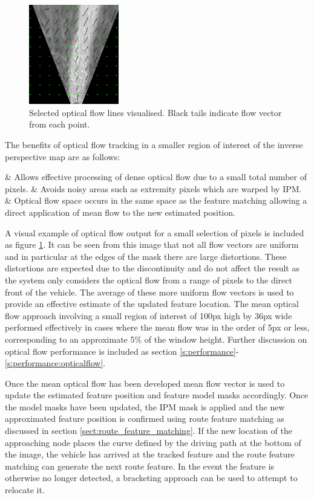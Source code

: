 \documentclass[]{aiaa-tc}%
\begin{document}
\begin{figure} %
	\centering
	\includegraphics[width=0.35\textwidth]{FeatureTracking/optical_flow_trails.png}
	\caption{Selected optical flow lines visualised. Black tails indicate flow vector from each point.}
	\label{f:optical_flow_trails}
\end{figure}

The benefits of optical flow tracking in a smaller region of interest of the inverse perspective map are as follows:
\begin{easylist}
	& Allows effective processing of dense optical flow due to a small total number of pixels.
	& Avoids noisy areas such as extremity pixels which are warped by IPM.
	& Optical flow space occurs in the same space as the feature matching allowing a direct application of mean flow to the new estimated position.
\end{easylist}

A visual example of optical flow output for a small selection of pixels is included as figure \ref{f:optical_flow_trails}. It can be seen from this image that not all flow vectors are uniform and in particular at the edges of the mask there are large distortions. These distortions are expected due to the discontinuity and do not affect the result as the system only considers the optical flow from a range of pixels to the direct front of the vehicle. The average of these more uniform flow vectors is used to provide an effective estimate of the updated feature location. The mean optical flow approach involving a small region of interest of 100px high by 36px wide performed effectively in cases where the mean flow was in the order of 5px or less, corresponding to an approximate 5\% of the window height. Further discussion on optical flow performance is included as section \ref{s:performance}-\ref{s:performance:opticalflow}. 

Once the mean optical flow has been developed mean flow vector is used to update the estimated feature position and feature model masks accordingly. Once the model masks have been updated, the IPM mask is applied and the new approximated feature position is confirmed using route feature matching as discussed in section \ref{sect:route_feature_matching}. If the new location of the approaching node places the curve defined by the driving path at the bottom of the image, the vehicle has arrived at the tracked feature and the route feature matching can generate the next route feature. In the event the feature is otherwise no longer detected, a bracketing approach can be used to attempt to relocate it.
\end{document}
